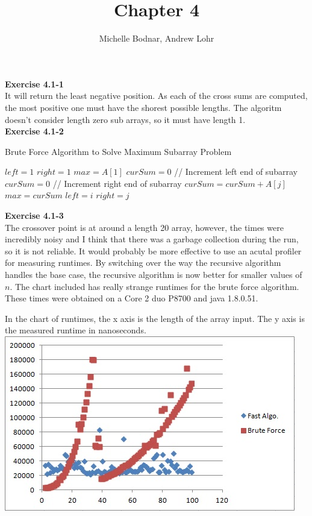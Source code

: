 \documentclass{article}
\title{Chapter 4}
\author{Michelle Bodnar, Andrew Lohr}
\begin{document}
\maketitle

\noindent\textbf{Exercise 4.1-1}\\

It will return the least negative position. As each of the cross sums are computed, the most positive one must have the shorest possible lengths. The algoritm doesn't consider length zero sub arrays, so it must have length 1.\\

\noindent\textbf{Exercise 4.1-2}\\

\begin{algorithm}
\caption{Brute Force Algorithm to Solve Maximum Subarray Problem}
\begin{algorithmic}
\State $left = 1$
\State $right = 1$
\State $max = A[1]$
\State $curSum = 0$
 // Increment left end of subarray
	\State $curSum = 0$
	 // Increment right end of subarray
		\State $curSum = curSum + A[j]$
			\State $max = curSum$
			\State $left = i$
			\State $right = j$
		\EndIf
	\EndFor
\EndFor
\end{algorithmic}
\end{algorithm}

\noindent\textbf{Exercise 4.1-3}\\

The crossover point is at around a length 20 array, however, the times were incredibly noisy and I think that there was a garbage collection during the run, so it is not reliable. It would probably be more effective to use an acutal profiler for measuring runtimes. By switching over the way the recursive algorithm handles the base case, the recursive algorithm is now better for smaller values of $n$. The chart included has really strange runtimes for the brute force algorithm. These times were obtained on a Core 2 duo P8700 and java 1.8.0.51.

In the chart of runtimes, the x axis is the length of the array input. The y axis is the measured runtime in nanoseconds.\\

\includegraphics{4(1)}
\end{document}

